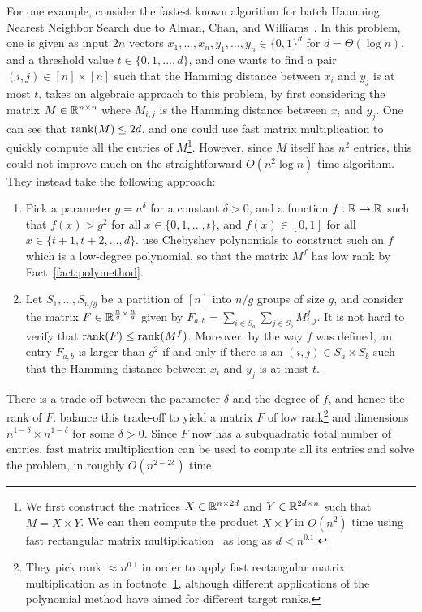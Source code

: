 For one example, consider the fastest known algorithm for batch Hamming Nearest Neighbor Search due to Alman, Chan, and Williams~\cite{acw16}. In this problem, one is given as input $2n$ vectors $x_1, \ldots, x_n, y_1, \ldots, y_n \in \{0,1\}^d$ for $d = \Theta(\log n)$, and a threshold value $t \in \{0,1,\ldots,d\}$, and one wants to find a pair $(i,j) \in [n] \times [n]$ such that the Hamming distance between $x_i$ and $y_j$ is at most $t$. \cite{acw16} takes an algebraic approach to this problem, by first considering the matrix $M \in {\mathbb R}^{n \times n}$ where $M_{i,j}$ is the Hamming distance between $x_i$ and $y_j$. One can see that $\operatorname{rank}(M) \leq 2d$, and one could use fast matrix multiplication to quickly compute all the entries of $M$\footnote{\label{foot1}We first construct the matrices $X \in {\mathbb R}^{n \times 2d}$ and $Y \in {\mathbb R}^{2d \times n}$ such that $M = X \times Y$. We can then compute the product $X \times Y$ in $\tilde{O}(n^2)$ time using fast rectangular matrix multiplication~\cite{c82,w18} as long as $d < n^{0.1}$.}. However, since $M$ itself has $n^2$ entries, this could not improve much on the straightforward $O(n^2 \log n)$ time algorithm. They instead take the following approach:
\begin{enumerate}
    \item Pick a parameter $g = n^\delta$ for a constant $\delta>0$, and a function $f : {\mathbb R} \to {\mathbb R}$ such that $f(x) > g^2$ for all $x \in \{0,1,\ldots,t\}$, and $f(x) \in [0,1]$ for all $x \in \{t+1, t+2, \ldots, d\}$. \cite{acw16} use Chebyshev polynomials to construct such an $f$ which is a low-degree polynomial, so that the matrix $M^f$ has low rank by Fact~\ref{fact:polymethod}.
    \item Let $S_1, \ldots, S_{n/g}$ be a partition of $[n]$ into $n/g$ groups of size $g$, and consider the matrix $F \in {\mathbb R}^{\frac{n}{g} \times \frac{n}{g}}$ given by $F_{a,b} = \sum_{i \in S_a} \sum_{j \in S_b} M^f_{i,j}$. It is not hard to verify that $\operatorname{rank}(F) \leq \operatorname{rank}(M^f)$. Moreover, by the way $f$ was defined, an entry $F_{a,b}$ is larger than $g^2$ if and only if there is an $(i,j) \in S_a \times S_b$ such that the Hamming distance between $x_i$ and $y_j$ is at most $t$.
\end{enumerate}
There is a trade-off between the parameter $\delta$ and the degree of $f$, and hence the rank of $F$. \cite{acw16} balance this trade-off to yield a matrix $F$ of low rank\footnote{They pick rank $\approx n^{0.1}$ in order to apply fast rectangular matrix multiplication as in footnote~\ref{foot1}, although different applications of the polynomial method have aimed for different target ranks.} and dimensions $n^{1-\delta} \times n^{1-\delta}$ for some $\delta>0$. Since $F$ now has a subquadratic total number of entries, fast matrix multiplication can be used to compute all its entries and solve the problem, in roughly $O(n^{2-2\delta})$ time.

